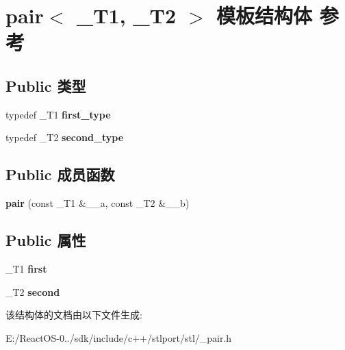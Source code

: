 \hypertarget{structpair}{}\section{pair$<$ \+\_\+\+T1, \+\_\+\+T2 $>$ 模板结构体 参考}
\label{structpair}
\subsection*{Public 类型}
\begin{DoxyCompactItemize}
\item 
\mbox{\label{structpair_a103271e77bfe7d96c21f5faf4b8d3ebf}} 
typedef \+\_\+\+T1 {\bfseries first\+\_\+type}
\item 
\mbox{\label{structpair_a434bb0cfd6db6488f941bc083e1075b0}} 
typedef \+\_\+\+T2 {\bfseries second\+\_\+type}
\end{DoxyCompactItemize}
\subsection*{Public 成员函数}
\begin{DoxyCompactItemize}
\item 
\mbox{\label{structpair_afd2aff84f38794a4727ac64cfcd276ee}} 
{\bfseries pair} (const \+\_\+\+T1 \&\+\_\+\+\_\+a, const \+\_\+\+T2 \&\+\_\+\+\_\+b)
\end{DoxyCompactItemize}
\subsection*{Public 属性}
\begin{DoxyCompactItemize}
\item 
\mbox{\label{structpair_ac81690133c8bdae4a32627f0784fbd80}} 
\+\_\+\+T1 {\bfseries first}
\item 
\mbox{\label{structpair_a2c3f18c486ccfab3d02e2212c75e5773}} 
\+\_\+\+T2 {\bfseries second}
\end{DoxyCompactItemize}


该结构体的文档由以下文件生成\+:\begin{DoxyCompactItemize}
\item 
E\+:/\+React\+O\+S-\/0../sdk/include/c++/stlport/stl/\+\_\+pair.\+h\end{DoxyCompactItemize}
